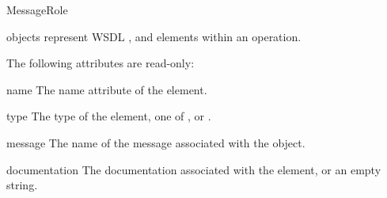 \begin{classdesc}{MessageRole}{}

 objects represent WSDL ,  
and  elements within an operation.

The following attributes are read-only:

\begin{memberdesc}{name}
The name attribute of the element.
\end{memberdesc}

\begin{memberdesc}{type}
The type of the element, one of ,  or 
.
\end{memberdesc}

\begin{memberdesc}{message}
The name of the message associated with the object.
\end{memberdesc}

\begin{memberdesc}{documentation}
The documentation associated with the element, or an empty string.
\end{memberdesc}

\end{classdesc}

